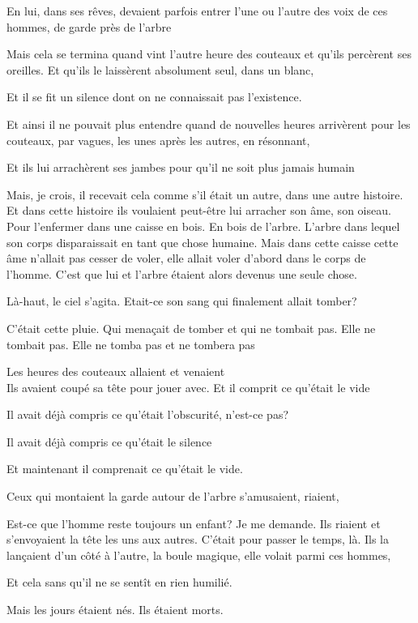 En lui, dans ses rêves, devaient parfois entrer l'une ou l'autre des
voix de ces hommes, de garde près de l'arbre

Mais cela se termina quand vint l'autre heure des couteaux et qu'ils
percèrent ses oreilles. Et qu'ils le laissèrent absolument seul, dans un
blanc,

Et il se fit un silence dont on ne connaissait pas l'existence.

Et ainsi il ne pouvait plus entendre quand de nouvelles heures
arrivèrent pour les couteaux, par vagues, les unes après les autres, en
résonnant,

Et ils lui arrachèrent ses jambes pour qu'il ne soit plus jamais humain

Mais, je crois, il recevait cela comme s'il était un autre, dans une
autre histoire. Et dans cette histoire ils voulaient peut-être lui
arracher son âme, son oiseau. Pour l'enfermer dans une caisse en bois.
En bois de l'arbre. L'arbre dans lequel son corps disparaissait en tant
que chose humaine. Mais dans cette caisse cette âme n'allait pas cesser
de voler, elle allait voler d'abord dans le corps de l'homme. C'est que
lui et l'arbre étaient alors devenus une seule chose.

Là-haut, le ciel s'agita. Etait-ce son sang qui finalement allait
tomber?

C'était cette pluie. Qui menaçait de tomber et qui ne tombait pas. Elle
ne tombait pas. Elle ne tomba pas et ne tombera pas

Les heures des couteaux allaient et venaient\\

Ils avaient coupé sa tête pour jouer avec. Et il comprit ce qu'était le
vide

Il avait déjà compris ce qu'était l'obscurité, n'est-ce pas?

Il avait déjà compris ce qu'était le silence

Et maintenant il comprenait ce qu'était le vide.

Ceux qui montaient la garde autour de l'arbre s'amusaient, riaient,

Est-ce que l'homme reste toujours un enfant? Je me demande. Ils riaient
et s'envoyaient la tête les uns aux autres. C'était pour passer le
temps, là. Ils la lançaient d'un côté à l'autre, la boule magique, elle
volait parmi ces hommes,

Et cela sans qu'il ne se sentît en rien humilié.

Mais les jours étaient nés. Ils étaient morts.\\

